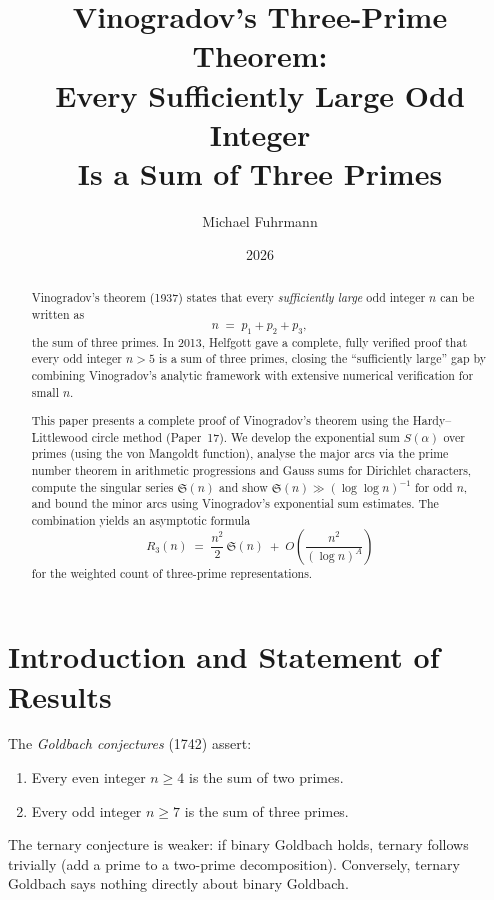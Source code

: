 \documentclass[12pt,a4paper]{amsart}
\theoremstyle{definition}
\begin{document}
\title{Vinogradov's Three-Prime Theorem:\\
       Every Sufficiently Large Odd Integer\\
       Is a Sum of Three Primes}

\author{Michael Fuhrmann}
\address{Specialist Mathematics Project, Build 80}
\date{2026}

\begin{abstract}
Vinogradov's theorem (1937) states that every \emph{sufficiently large}
odd integer $n$ can be written as
\[
  n \;=\; p_1 + p_2 + p_3,
\]
the sum of three primes.  In 2013, Helfgott gave a complete, fully
verified proof that every odd integer $n > 5$ is a sum of three primes,
closing the ``sufficiently large'' gap by combining Vinogradov's analytic
framework with extensive numerical verification for small $n$.

This paper presents a complete proof of Vinogradov's theorem using the
Hardy--Littlewood circle method (Paper~17).  We develop the exponential
sum $S(\alpha)$ over primes (using the von Mangoldt function), analyse
the major arcs via the prime number theorem in arithmetic progressions
and Gauss sums for Dirichlet characters, compute the singular series
$\mathfrak{S}(n)$ and show $\mathfrak{S}(n) \gg (\log\log n)^{-1}$ for
odd $n$, and bound the minor arcs using Vinogradov's exponential sum
estimates.  The combination yields an asymptotic formula
\[
  R_3(n) \;=\; \frac{n^2}{2}\,\mathfrak{S}(n)
                \;+\; O\!\left(\frac{n^2}{(\log n)^A}\right)
\]
for the weighted count of three-prime representations.
\end{abstract}

\maketitle
\tableofcontents

\section{Introduction and Statement of Results}

The \emph{Goldbach conjectures} (1742) assert:
\begin{enumerate}
  \item[(Binary)] Every even integer $n \geq 4$ is the sum of two primes.
  \item[(Ternary)] Every odd integer $n \geq 7$ is the sum of three primes.
\end{enumerate}
The ternary conjecture is weaker: if binary Goldbach holds, ternary
follows trivially (add a prime to a two-prime decomposition).
Conversely, ternary Goldbach says nothing directly about binary Goldbach.
\end{document}
